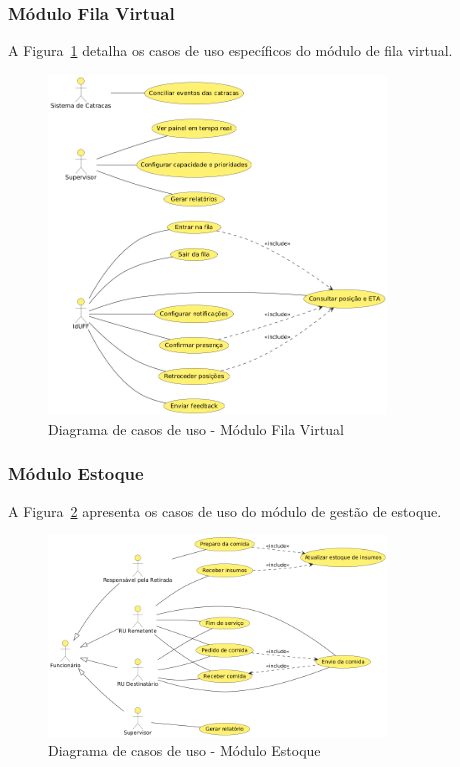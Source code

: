 \documentclass[12pt,a4paper]{article}
\begin{document}
\subsubsection{Módulo Fila Virtual}
A Figura~\ref{fig:diagrama_fila} detalha os casos de uso específicos do módulo de fila virtual.

\begin{figure}[htbp]
    \centering
    \includegraphics[width=0.8\textwidth]{diagramas/diagrama-fila.png}
    \caption{Diagrama de casos de uso - Módulo Fila Virtual}
    \label{fig:diagrama_fila}
\end{figure}

\subsubsection{Módulo Estoque}
A Figura~\ref{fig:diagrama_estoque} apresenta os casos de uso do módulo de gestão de estoque.

\begin{figure}[htbp]
    \centering
    \includegraphics[width=0.8\textwidth]{diagramas/diagrama-estoque.png}
    \caption{Diagrama de casos de uso - Módulo Estoque}
    \label{fig:diagrama_estoque}
\end{figure}
\end{document}

